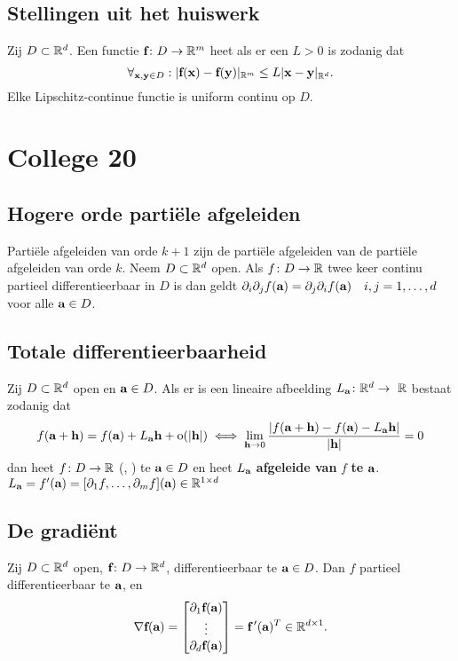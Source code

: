 \documentclass{2wa40summary}
\begin{document}
	
	
	\subsection{Stellingen uit het huiswerk}
	\theorem Zij $D \subset \mathbb{R}^d$. Een functie ${\textbf{f}}\colon D \to \mathbb{R}^m$ heet  als er een $L>0$ is zodanig dat
	\[\forall _{{\textbf{x}},{\textbf{y}} \in D}: |{\textbf{f}}({\textbf{x}})-{\textbf{f}}({\textbf{y}})|_{\mathbb{R}^m} \leq L|{\textbf{x}}-{\textbf{y}}|_{\mathbb{R}^d}.\]
	Elke Lipschitz-continue functie is uniform continu op $D$.
	\newpage
	\section{College 20}
	\subsection{Hogere orde parti\"ele afgeleiden}
	 Parti\"ele afgeleiden van orde $k+1$ zijn de parti\"ele afgeleiden van de parti\"ele afgeleiden van orde $k$.
	 Neem $D \subset \mathbb{R}^d$ open. Als $f\colon D \to \mathbb{R}$ twee keer continu partieel differentieerbaar in $D$ is
        dan geldt $\partial_i \partial_j f({\textbf{a}}) = \partial_j \partial_i f({\textbf{a}}) \quad i,j=1,\dots ,d$ voor alle ${\textbf{a}} \in D$.
	\subsection{Totale differentieerbaarheid}
	 Zij $D \subset \mathbb{R}^d$ open en ${\textbf{a}} \in D$. Als
 er is een lineaire afbeelding $L_{{\textbf{a}}}\colon\mathbb{R}^d \to~\mathbb{R}$ bestaat zodanig dat
	\[f({\textbf{a}}+{\textbf{h}})=f({\textbf{a}})+ L_{{\textbf{a}}} {\textbf{h}} +\mathrm{o}({\left|{\textbf{h}}\right|})\iff\lim_{{\textbf{h}}\to0}\frac{{\left|f({\textbf{a}}+{\textbf{h}})-f({\textbf{a}})-L_{{\textbf{a}}} {\textbf{h}}\right|}}{{\left|{\textbf{h}}\right|}} = 0\]
 dan heet $f\colon D \to \mathbb{R}$  (, ) te ${\textbf{a}} \in D$
	en heet $L_{{\textbf{a}}}$ \textbf{afgeleide van} $f$ \textbf{te} ${\textbf{a}}$.
	\nota $L_{{\textbf{a}}} = f'({\textbf{a}}) = [\partial_1 f,\ldots,\partial_m f]({\textbf{a}})\in\mathbb{R}^{1\times d}$
	\subsection{De gradi\"ent}
	 Zij $D \subset \mathbb{R}^d$ open, ${\textbf{f}}\colon  D \to \mathbb{R}^d$, differentieerbaar te ${\textbf{a}} \in D$. Dan $f$ partieel differentieerbaar te ${\textbf{a}}$, en
\[\nabla {\textbf{f}}({\textbf{a}})= \begin{bmatrix}
\partial_1 {\textbf{f}}({\textbf{a}}) \\
\vdots \\
\partial_d {\textbf{f}}({\textbf{a}})
\end{bmatrix} = {\textbf{f}}\,' ({\textbf{a}})^{T}\in\mathbb{R}^{d\times 1}.
\]
\end{document}
